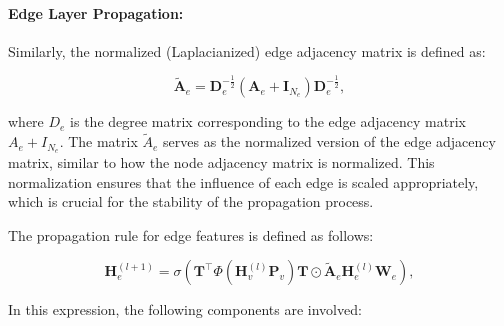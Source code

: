 \paragraph{Edge Layer Propagation:}

Similarly, the normalized (Laplacianized) edge adjacency matrix is defined as:

\begin{equation}
    \tilde{\mathbf{A}}_e = \mathbf{D}_e^{-\frac{1}{2}} \left(\mathbf{A}_e + \mathbf{I}_{N_e}\right) \mathbf{D}_e^{-\frac{1}{2}},
    \label{eq:normalized_edge_adjacency}
\end{equation}


where \( D_e \) is the degree matrix corresponding to the edge adjacency matrix \( A_e + I_{N_e} \). The matrix \( \tilde{A}_e \) serves as the normalized version of the edge adjacency matrix, similar to how the node adjacency matrix is normalized. This normalization ensures that the influence of each edge is scaled appropriately, which is crucial for the stability of the propagation process.

The propagation rule for edge features is defined as follows:


\begin{equation}
    \mathbf{H}^{(l+1)}_e = \sigma\left(\mathbf{T}^\top \Phi\left(\mathbf{H}^{(l)}_v \mathbf{P}_v\right) \mathbf{T} \odot \tilde{\mathbf{A}}_e \mathbf{H}^{(l)}_e \mathbf{W}_e\right),
\end{equation}

In this expression, the following components are involved:

